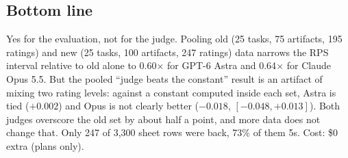 
\subsection*{Bottom line}
Yes for the evaluation, not for the judge. Pooling old (25 tasks, 75 artifacts, 195 ratings) and new (25 tasks, 100 artifacts,
247 ratings) data narrows the RPS interval relative to old alone to 0.60$\times$ for GPT-6 Astra and 0.64$\times$ for Claude Opus 5.5.
But the pooled ``judge beats the constant'' result is an artifact of mixing two rating levels: against a constant computed
inside each set, Astra is tied ($+0.002$) and Opus is not clearly better ($-0.018$, $[-0.048, +0.013]$). Both judges overscore
the old set by about half a point, and more data does not change that. Only 247 of 3,300 sheet rows were back, 73\% of them 5s.
Cost: \$0 extra (plans only).

